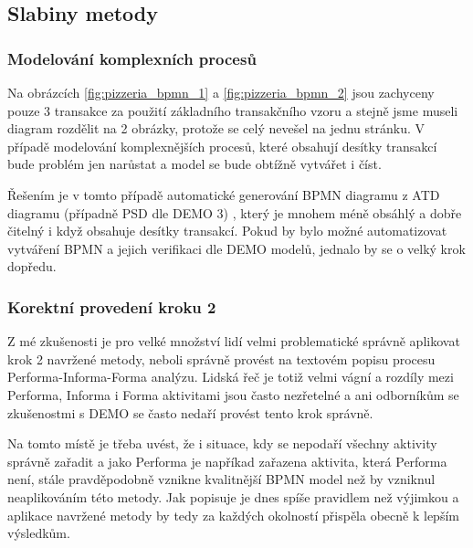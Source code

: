 \documentclass[]{article}
\begin{document}
\subsection{Slabiny metody}
\subsubsection{Modelování komplexních procesů}
Na obrázcích \ref{fig:pizzeria_bpmn_1} a \ref{fig:pizzeria_bpmn_2} jsou zachyceny pouze 3 transakce za použití základního transakčního vzoru a stejně jsme museli diagram rozdělit na 2 obrázky, protože se celý nevešel na jednu stránku. V případě modelování komplexnějších procesů, které obsahují desítky transakcí bude problém jen narůstat a model se bude obtížně vytvářet i číst.

Řešením je v tomto případě automatické generování BPMN diagramu z ATD diagramu (případně PSD dle DEMO 3) , který je mnohem méně obsáhlý a dobře čitelný i když obsahuje desítky transakcí. Pokud by bylo možné automatizovat vytváření BPMN a jejich verifikaci dle DEMO modelů, jednalo by se o velký krok dopředu.

\subsubsection{Korektní provedení kroku 2}
Z mé zkušenosti je pro velké množství lidí velmi problematické správně aplikovat krok 2 navržené metody, neboli správně provést na textovém popisu procesu Performa-Informa-Forma analýzu. Lidská řeč je totiž velmi vágní a rozdíly mezi Performa, Informa i Forma aktivitami jsou často nezřetelné a ani odborníkům se zkušenostmi s DEMO se často nedaří provést tento krok správně.

Na tomto místě je třeba uvést, že i situace, kdy se nepodaří všechny aktivity správně zařadit a jako Performa je napříkad zařazena aktivita, která Performa není, stále pravděpodobně vznikne kvalitnější BPMN model než by vzniknul neaplikováním této metody. Jak popisuje \cite{Silver2011}  je dnes spíše pravidlem než výjimkou a aplikace navržené metody by tedy za každých okolností přispěla obecně k lepším výsledkům.

\nocite{*}


\end{document}
